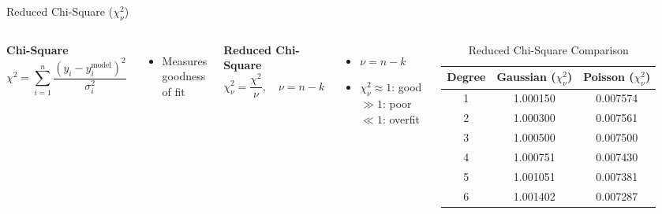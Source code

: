 \documentclass[aspectratio=169]{beamer}
\begin{document}
\begin{frame}{Reduced Chi-Square ($\chi^2_\nu$)}
\begin{columns}

\textbf{Chi-Square}
\begin{equation*}
\chi^2 = \sum_{i=1}^{n} \frac{(y_i - y_i^{\text{model}})^2}{\sigma_i^2}
\end{equation*}

\begin{itemize}
    \item Measures goodness of fit
\end{itemize}
\textbf{Reduced Chi-Square}
\begin{equation*}
\chi^2_\nu = \frac{\chi^2}{\nu}, \quad \nu = n - k
\end{equation*}

\begin{itemize}
    \item $\nu = n - k$
    \item $\chi^2_\nu \approx 1$: good \quad $\gg 1$: poor \quad $\ll 1$: overfit
\end{itemize}

\centering
\begin{table}[h]
\centering
\begin{tabular}{cc c}
\hline
 \textbf{Degree}&\textbf{Gaussian ($\chi^2_\nu$)} & \textbf{Poisson ($\chi^2_\nu$)} \\
\hline
 1&1.000150 & 0.007574 \\
 2&1.000300 & 0.007561 \\
 3&1.000500 & 0.007500 \\
 4&1.000751 & 0.007430 \\
 5&1.001051 & 0.007381 \\
 6&1.001402 & 0.007287 \\
\hline
\end{tabular}
\caption{Reduced Chi-Square Comparison}
\end{table}
\end{columns}
\end{frame}
\end{document}
